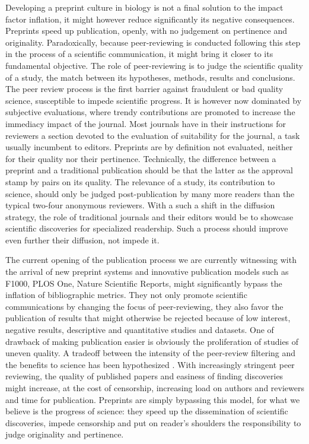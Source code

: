 \documentclass[letterpaper,twocolumn,superscriptaddress,showkeys,longbibliography]{revtex4-1}
\begin{document}
Developing a preprint culture in biology is not a final solution to the impact
factor inflation, it might however reduce significantly its negative
consequences. Preprints speed up publication, openly, with no judgement on
pertinence and originality. Paradoxically, because peer-reviewing is conducted
following this step in the process of a scientific communication, it might bring
it closer to its fundamental objective. The role of peer-reviewing is to judge
the scientific quality of a study, the match between its hypotheses, methods,
results and conclusions. The peer review process is the first barrier against
fraudulent or bad quality science, susceptible to impede scientific progress. It
is however now dominated by subjective evaluations, where trendy contributions
are promoted to increase the immediacy impact of the journal. Most journals have
in their instructions for reviewers a section devoted to the evaluation of
suitability for the journal, a task usually incumbent to editors. Preprints are
by definition not evaluated, neither for their quality nor their pertinence.
Technically, the difference between a preprint and a traditional publication
should be that the latter as the approval stamp by pairs on its quality. The
relevance of a study, its contribution to science, should only be judged
post-publication by many more readers than the typical two-four anonymous
reviewers. With a such a shift in the diffusion strategy, the role of
traditional journals and their editors would be to showcase scientific
discoveries for specialized readership. Such a process should improve even
further their diffusion, not impede it. 

The current opening of the publication process we are currently witnessing with
the arrival of new preprint systems and innovative publication models such as
F1000, PLOS One, Nature Scientific Reports, might significantly bypass the
inflation of bibliographic metrics. They not only promote scientific communications
by changing the focus of peer-reviewing, they also favor the publication of
results that might otherwise be rejected because of low interest, negative
results, descriptive and quantitative studies and datasets. One of drawback of
making publication easier is obviously the proliferation of studies of uneven
quality. A tradeoff between the intensity of the peer-review filtering and the
benefits to science has been hypothesized \cite{Aarssen2012}. With increasingly
stringent peer reviewing, the quality of published papers and easiness of
finding discoveries might increase, at the cost of censorship, increasing load
on authors and reviewers and time for publication. Preprints are simply
bypassing this model, for what we believe is the progress of science: they speed
up the dissemination of scientific discoveries, impede censorship and put on
reader's shoulders the responsibility to judge originality and pertinence.
\end{document}

